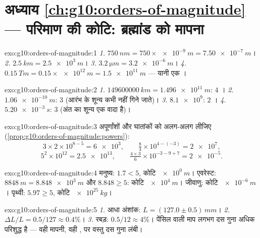 \section*{अध्याय \ref{ch:g10:orders-of-magnitude} --- परिमाण की कोटि: ब्रह्मांड को मापना}

\begin{solution}{exo:g10:orders-of-magnitude:1}
\emph{1.} $\qty{750}{nm} = 750 \times \qty{e-9}{m} = \qty{7.50e-7}{m}$।
\emph{2.} $\qty{2.5}{km} = \qty{2.5e3}{m}$।
\emph{3.} $\qty{3.2}{\micro m} = \qty{3.2e-6}{m}$।
\emph{4.} $\qty{0.15}{Tm} = 0.15 \times \qty{e12}{m} = \qty{1.5e11}{m}$ --- यानी एक ।
\end{solution}

\begin{solution}{exo:g10:orders-of-magnitude:2}
\emph{1.} $\qty{149600000}{km} = \qty{1.496e11}{m}$: $4$ ।
\emph{2.} $\qty{1.06e-10}{m}$: $3$  (आरंभ के शून्य कभी नहीं
गिने जाते)।
\emph{3.} $\num{8.1e9}$: $2$ ।
\emph{4.} $\qty{5.20e-3}{s}$: $3$  (अंत का शून्य एक वादा है)।
\end{solution}

\begin{solution}{exo:g10:orders-of-magnitude:3}
अपूर्णांशों और घातांकों को अलग-अलग लीजिए (\cref{prop:g10:orders-of-magnitude:powers}):
\[
3 \times 2 \times 10^{8-5} = \num{6e3}, \qquad
\tfrac{8}{4} \times 10^{4-(-3)} = \num{2e7},
\]
\[
5^{2} \times 10^{12} = \num{2.5e13}, \qquad
\tfrac{4 \times 3}{6} \times 10^{-3-9+7} = \num{2e-5} .
\]
\end{solution}

\begin{solution}{exo:g10:orders-of-magnitude:4}
मनुष्य: $1.7 < 5$, कोटि $\qty{e0}{m}$। एवरेस्ट: $\qty{8848}{m} = \qty{8.848e3}{m}$ और $8.848 \geq 5$: कोटि $\qty{e4}{m}$।
जीवाणु: कोटि $\qty{e-6}{m}$। पृथ्वी: $5.97 \geq 5$, कोटि $\qty{e25}{kg}$।
\end{solution}

\begin{solution}{exo:g10:orders-of-magnitude:5}
\emph{1.} आधा अंशांक: $L = (127.0 \pm 0.5)\,\unit{mm}$।
\emph{2.} $\Delta L / L = 0.5/127 \approx 0.4\%$।
\emph{3.} रबड़: $0.5/12 \approx 4\%$। पेंसिल वाली माप लगभग दस गुना अधिक परिशुद्ध है
--- वही मापनी, वही , पर वस्तु दस गुना लंबी।
\end{solution}

